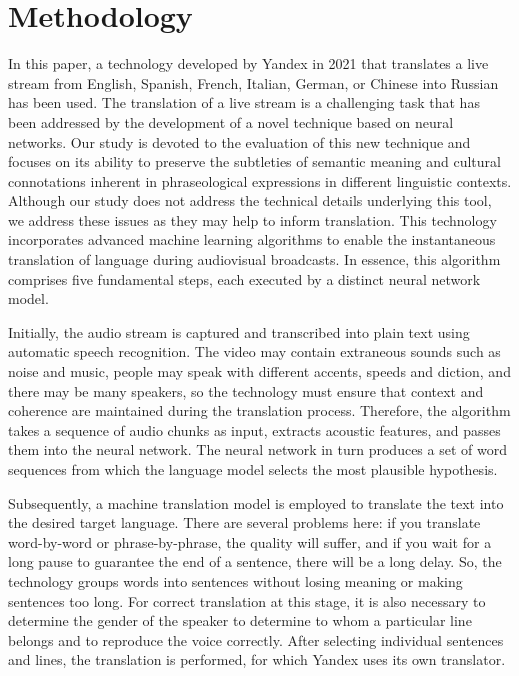 \section{Methodology}\label{sec-methodology}

In this paper, a technology developed by Yandex in 2021 that translates
a live stream from English, Spanish, French, Italian, German, or Chinese
into Russian has been used. The translation of a live stream is a
challenging task that has been addressed by the development of a novel
technique based on neural networks. Our study is devoted to the
evaluation of this new technique and focuses on its ability to preserve
the subtleties of semantic meaning and cultural connotations inherent in
phraseological expressions in different linguistic contexts. Although
our study does not address the technical details underlying this tool,
we address these issues as they may help to inform translation. This
technology incorporates advanced machine learning algorithms to enable
the instantaneous translation of language during audiovisual broadcasts.
In essence, this algorithm comprises five fundamental steps, each
executed by a distinct neural network model.

Initially, the audio stream is captured and transcribed into plain text
using automatic speech recognition. The video may contain extraneous
sounds such as noise and music, people may speak with different accents,
speeds and diction, and there may be many speakers, so the technology
must ensure that context and coherence are maintained during the
translation process. Therefore, the algorithm takes a sequence of audio
chunks as input, extracts acoustic features, and passes them into the
neural network. The neural network in turn produces a set of word
sequences from which the language model selects the most plausible
hypothesis.

Subsequently, a machine translation model is employed to translate the
text into the desired target language. There are several problems here:
if you translate word-by-word or phrase-by-phrase, the quality will
suffer, and if you wait for a long pause to guarantee the end of a
sentence, there will be a long delay. So, the technology groups words
into sentences without losing meaning or making sentences too long. For
correct translation at this stage, it is also necessary to determine the
gender of the speaker to determine to whom a particular line belongs and
to reproduce the voice correctly. After selecting individual sentences
and lines, the translation is performed, for which Yandex uses its own
translator.

